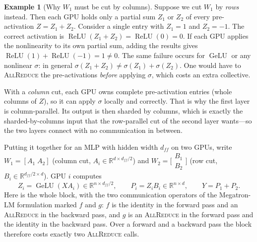 \documentclass[11pt,a4paper]{article}
\theoremstyle{definition}
\newtheorem{example}[definition]{Example}
\theoremstyle{remark}
\theoremstyle{plain}
\DeclareMathOperator{\GeLU}{GeLU}
\DeclareMathOperator{\ReLU}{ReLU}
\begin{document}
\begin{example}[Why $W_1$ must be cut by columns]
\label{ex:tp-relu}
Suppose we cut $W_1$ by \emph{rows} instead. Then each GPU holds only a
partial sum $Z_1$ or $Z_2$ of every pre-activation $Z=Z_1+Z_2$. Consider a
single entry with $Z_1=1$ and $Z_2=-1$. The correct activation is
$\ReLU(Z_1+Z_2)=\ReLU(0)=0$. If each GPU applies the nonlinearity to its
own partial sum, adding the results gives $\ReLU(1)+\ReLU(-1)=1\neq0$.
The same failure occurs for $\GeLU$ or any nonlinear $\sigma$: in general
$\sigma(Z_1+Z_2)\neq\sigma(Z_1)+\sigma(Z_2)$. One would have to
\textsc{AllReduce} the pre-activations \emph{before} applying $\sigma$,
which costs an extra collective.

With a \emph{column} cut, each GPU owns complete pre-activation entries
(whole columns of $Z$), so it can apply $\sigma$ locally and correctly.
That is why the first layer is column-parallel. Its output is then
sharded by columns, which is exactly the sharded-by-columns input that the
row-parallel cut of the second layer wants---so the two layers connect
with no communication in between.
\end{example}

Putting it together for an MLP with hidden width $d_{ff}$ on two GPUs,
write $W_1=[A_1\;A_2]$ (column cut, $A_i\in\mathbb{R}^{d\times d_{ff}/2}$)
and $W_2=\bigl[\begin{smallmatrix}B_1\\B_2\end{smallmatrix}\bigr]$ (row
cut, $B_i\in\mathbb{R}^{d_{ff}/2\times d}$). GPU $i$ computes
\[
  Z_i=\GeLU(XA_i)\in\mathbb{R}^{n\times d_{ff}/2},\qquad
  P_i=Z_iB_i\in\mathbb{R}^{n\times d},\qquad
  Y=P_1+P_2 .
\]
Here is the whole block, with the two communication operators of the
Megatron-LM formulation marked $f$ and $g$: $f$ is the identity in the
forward pass and an \textsc{AllReduce} in the backward pass, and $g$ is an
\textsc{AllReduce} in the forward pass and the identity in the backward pass.
Over a forward and a backward pass the block therefore costs exactly two
\textsc{AllReduce} calls.
\end{document}
